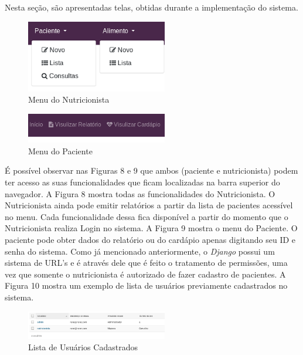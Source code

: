 \documentclass[
	12pt,				%
    oneside,			%
	a4paper,			%
	english,			%
	french,				%
	spanish,			%
	brazil,				%
	]{abntex2}
\begin{document}
Nesta seção, são apresentadas telas, obtidas durante a implementação do sistema.

\begin{figure} [hbt] 
\begin{center}
\includegraphics[width=0.55\textwidth]{menuNut1.png}
\end{center}
\label{menuNut} 
\caption{Menu do Nutricionista}
\end{figure}

\begin{figure} [hbt] 
\begin{center}
\includegraphics[width=0.55\textwidth]{menuPac1.png}
\end{center}
\label{menuPac} 
\caption{Menu do Paciente}
\end{figure}

É possível observar nas Figuras 8 e 9 que ambos (paciente e nutricionista) podem ter acesso as suas funcionalidades que ficam localizadas na barra superior do navegador.
A Figura 8 mostra todas as funcionalidades do Nutricionista. O Nutricionista
ainda pode emitir relatórios a partir da lista de pacientes acessível no menu. Cada
funcionalidade dessa fica disponível a partir do momento que o Nutricionista realiza 
Login no sistema. A Figura 9 mostra o menu do Paciente. O paciente pode obter dados
do relatório ou do cardápio apenas digitando seu ID e senha do sistema.
Como já mencionado anteriormente, o \textit{Django} possui um sistema de URL's e é através dele que
é feito o tratamento de permissões, uma vez que somente o nutricionista é autorizado de fazer cadastro
de pacientes. A Figura 10 mostra um exemplo de lista de usuários previamente cadastrados no sistema.

\begin{figure} [hbt]
\begin{center}
\includegraphics[width=0.55\textwidth]{listaUsuarios.png}
\end{center}
\label{listUser} 
\caption{Lista de Usuários Cadastrados}
\end{figure}
\end{document}
